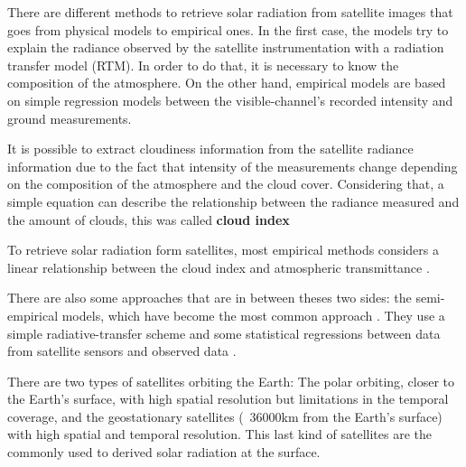 There are different methods to retrieve solar radiation from satellite images that goes from physical models to empirical ones. In the first case, the models try to explain the radiance observed by the satellite instrumentation with a radiation transfer model (RTM). In order to do that, it is necessary to know the composition of the atmosphere. On the other hand, empirical models are based on simple regression models between the visible-channel's recorded intensity and ground measurements. 

It is possible to extract cloudiness information from the satellite radiance information due to the fact that intensity of the measurements change depending on the composition of the atmosphere and the cloud cover. Considering that, a simple equation can describe the relationship between the radiance measured and the amount of clouds, this was called \textbf{cloud index} \cite*{Cano1986}

To retrieve solar radiation form satellites, most empirical methods considers a linear relationship between the cloud index and atmospheric transmittance \cite*{Cano1986, Diabate1987, Ineichen1999, Zarzalejo2005, Polo2008}.  

There are also some approaches that are in between theses two sides: the semi-empirical models, which have become the most common approach \cite*{Polo2008}. They use a simple radiative-transfer scheme and some statistical regressions between data from satellite sensors and observed data \cite*{schmetz1989, pinker1995, Kleiss2013}.


There are two types of satellites orbiting the Earth: The polar orbiting, closer to the Earth's surface,  with high spatial resolution but limitations in the temporal coverage, and the geostationary satellites (~36000km from the Earth's surface) with high spatial and temporal resolution. This last kind of satellites are the commonly used to derived solar radiation at the surface.

